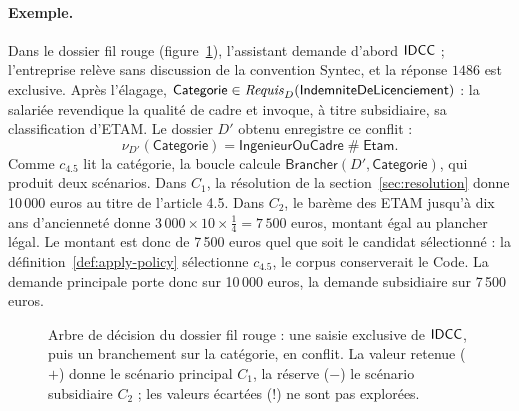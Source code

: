\documentclass[review]{jflart}
\newcommand{\Brancher}{\ensuremath{\mathsf{Brancher}}}
\newcommand{\conflit}{\mathbin{\#}}
\newcommand{\Categorie}{\ensuremath{\mathsf{Categorie}}}
\newcommand{\Cadre}{\ensuremath{\mathsf{IngenieurOuCadre}}}
\newcommand{\Etam}{\ensuremath{\mathsf{Etam}}}
\renewcommand{\Indem}{\ensuremath{\mathsf{IndemniteDeLicenciement}}}
\begin{document}
\paragraph{Exemple.}
Dans le dossier fil rouge (figure~\ref{fig:decision}), l'assistant demande
d'abord \(\mathsf{IDCC}\) ; l'entreprise relève sans discussion de la convention
Syntec, et la réponse \(1486\) est exclusive. Après l'élagage,
\(\Categorie\in\NeedFacts_D(\Indem)\) : la salariée revendique la qualité de
cadre et invoque, à titre subsidiaire, sa classification d'ETAM. Le dossier
\(D'\) obtenu enregistre ce conflit :
\[
\nu_{D'}(\Categorie)=\Cadre\conflit\Etam.
\] Comme \(c_{4.5}\) lit la
catégorie, la boucle calcule \(\Brancher(D',\Categorie)\), qui produit deux
scénarios. Dans \(C_1\), la résolution de la section~\ref{sec:resolution} donne
10\,000 euros au titre de l'article 4.5. Dans \(C_2\), le barème des ETAM
jusqu'à dix ans d'ancienneté donne \(3\,000\times10\times\frac14=7\,500\)
euros, montant égal au plancher légal. Le montant est donc de 7\,500 euros quel
que soit le candidat sélectionné : la définition~\ref{def:apply-policy}
sélectionne \(c_{4.5}\), le corpus conserverait le Code. La demande principale
porte donc sur 10\,000 euros, la demande subsidiaire sur 7\,500 euros.

\begin{figure}
\centering
{}
\caption{Arbre de décision du dossier fil rouge : une saisie exclusive de
  \(\mathsf{IDCC}\), puis un branchement sur la catégorie, en conflit. La valeur
  retenue (\(+\)) donne le scénario principal \(C_1\), la réserve (\(-\)) le
  scénario subsidiaire \(C_2\) ; les valeurs écartées (\(!\)) ne sont pas
    explorées.}
\label{fig:decision}
\end{figure}
\end{document}
